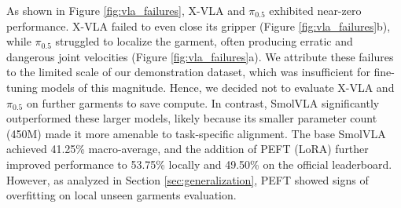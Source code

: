 As shown in Figure \ref{fig:vla_failures}, X-VLA and $\pi_{0.5}$ exhibited near-zero performance. X-VLA failed to even close its gripper (Figure \ref{fig:vla_failures}b), while $\pi_{0.5}$ struggled to localize the garment, often producing erratic and dangerous joint velocities (Figure \ref{fig:vla_failures}a). We attribute these failures to the limited scale of our demonstration dataset, which was insufficient for fine-tuning models of this magnitude. Hence, we decided not to evaluate X-VLA and $\pi_{0.5}$ on further garments to save compute. In contrast, SmolVLA significantly outperformed these larger models, likely because its smaller parameter count (450M) made it more amenable to task-specific alignment. The base SmolVLA achieved 41.25\% macro-average, and the addition of PEFT (LoRA) further improved performance to 53.75\% locally and 49.50\% on the official leaderboard. However, as analyzed in Section \ref{sec:generalization}, PEFT showed signs of overfitting on local unseen garments evaluation.
